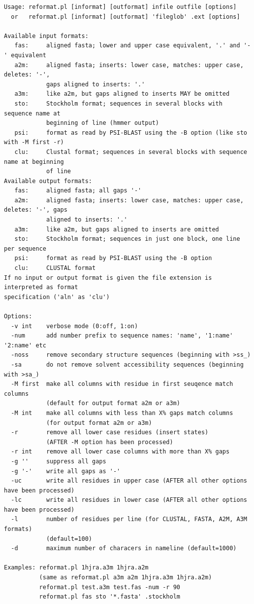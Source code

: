 \documentclass[11pt,a4paper]{article}
\begin{document}
\small \begin{verbatim}
Usage: reformat.pl [informat] [outformat] infile outfile [options] 
  or   reformat.pl [informat] [outformat] 'fileglob' .ext [options] 

Available input formats:
   fas:     aligned fasta; lower and upper case equivalent, '.' and '-' equivalent
   a2m:     aligned fasta; inserts: lower case, matches: upper case, deletes: '-',
            gaps aligned to inserts: '.'
   a3m:     like a2m, but gaps aligned to inserts MAY be omitted
   sto:     Stockholm format; sequences in several blocks with sequence name at 
            beginning of line (hmmer output)
   psi:     format as read by PSI-BLAST using the -B option (like sto with -M first -r)
   clu:     Clustal format; sequences in several blocks with sequence name at beginning 
            of line
Available output formats:
   fas:     aligned fasta; all gaps '-'
   a2m:     aligned fasta; inserts: lower case, matches: upper case, deletes: '-', gaps 
            aligned to inserts: '.'
   a3m:     like a2m, but gaps aligned to inserts are omitted
   sto:     Stockholm format; sequences in just one block, one line per sequence
   psi:     format as read by PSI-BLAST using the -B option 
   clu:     CLUSTAL format
If no input or output format is given the file extension is interpreted as format 
specification ('aln' as 'clu')

Options:
  -v int    verbose mode (0:off, 1:on)
  -num      add number prefix to sequence names: 'name', '1:name' '2:name' etc
  -noss     remove secondary structure sequences (beginning with >ss_)
  -sa       do not remove solvent accessibility sequences (beginning with >sa_)
  -M first  make all columns with residue in first seuqence match columns 
            (default for output format a2m or a3m)
  -M int    make all columns with less than X% gaps match columns 
            (for output format a2m or a3m)
  -r        remove all lower case residues (insert states) 
            (AFTER -M option has been processed)
  -r int    remove all lower case columns with more than X% gaps
  -g ''     suppress all gaps
  -g '-'    write all gaps as '-'
  -uc       write all residues in upper case (AFTER all other options have been processed)
  -lc       write all residues in lower case (AFTER all other options have been processed)
  -l        number of residues per line (for CLUSTAL, FASTA, A2M, A3M formats) 
            (default=100)
  -d        maximum number of characers in nameline (default=1000)

Examples: reformat.pl 1hjra.a3m 1hjra.a2m  
          (same as reformat.pl a3m a2m 1hjra.a3m 1hjra.a2m)
          reformat.pl test.a3m test.fas -num -r 90
          reformat.pl fas sto '*.fasta' .stockholm
\end{verbatim} \normalsize
\end{document}
